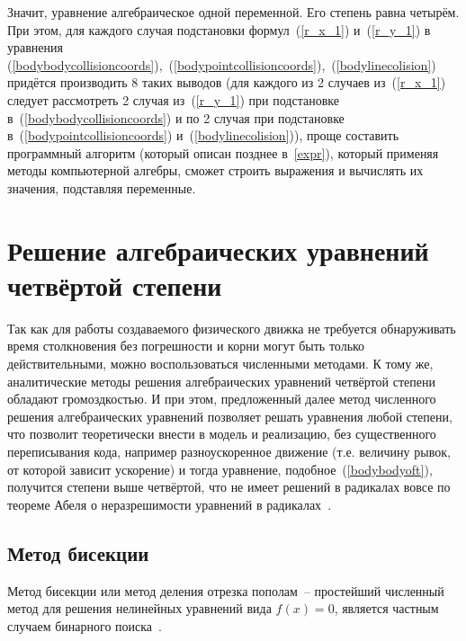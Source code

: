 

Значит, уравнение алгебраическое одной переменной. Его степень равна четырём.
При этом, для каждого случая подстановки формул~(\ref{r_x_1}) и~(\ref{r_y_1}) в уравнения
(\ref{bodybodycollisioncoords}),~(\ref{bodypointcollisioncoords}),~(\ref{bodylinecolision})
придётся производить 8 таких выводов
(для каждого из 2 случаев из~(\ref{r_x_1}) следует рассмотреть 2 случая из~(\ref{r_y_1}) при подстановке в~(\ref{bodybodycollisioncoords})
и по 2 случая при подстановке в~(\ref{bodypointcollisioncoords}) и~(\ref{bodylinecolision})),
проще составить программный алгоритм (который описан позднее в~\ref{expr}),
который применяя методы компьютерной алгебры, сможет строить выражения и вычислять их значения, подставляя переменные.

\section{Решение алгебраических уравнений четвёртой степени}\label{solvefourthdegree}

Так как для работы создаваемого физического движка не требуется обнаруживать время столкновения
без погрешности и корни могут быть только действительными, можно воспользоваться численными методами.
К тому же, аналитические методы решения алгебраических уравнений четвёртой степени обладают громоздкостью.
И при этом, предложенный далее метод численного решения алгебраических уравнений позволяет решать уравнения любой степени,
что позволит теоретически внести в модель и реализацию, без существенного переписывания кода, например разноускоренное движение
(т.е. величину рывок, от которой зависит ускорение) и тогда уравнение, подобное~(\ref{bodybodyoft}),
получится степени выше четвёртой, что не имеет решений в радикалах вовсе по теореме Абеля о неразрешимости уравнений в радикалах~\cite[с.~112]{alekseevabel}.

\subsection{Метод бисекции}\label{bisection}
Метод бисекции или метод деления отрезка пополам~-- простейший численный метод для решения нелинейных уравнений вида \(f(x)=0\),
является частным случаем бинарного поиска~\cite{bisectionkaw}.

